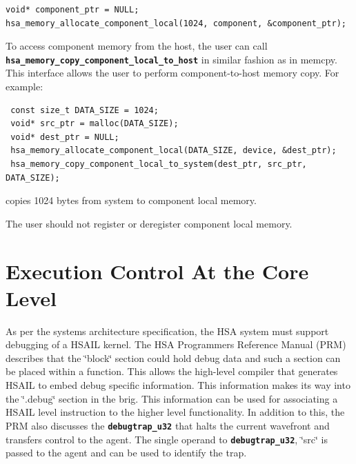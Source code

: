 \documentclass{book}
\newcommand{\diffblock}[1]{#1}
\newcommand{\ttbf}[1]{\diffblock{\texttt{\textbf{#1}}}}
\begin{document}
\begin{framed}
\begin{lstlisting}
void* component_ptr = NULL;
hsa_memory_allocate_component_local(1024, component, &component_ptr);
\end{lstlisting}
\end{framed}

To access component memory from the host, the user can call
\ttbf{hsa\_memory\_copy\_component\_local\_to\_host} in similar
fashion as in memcpy. This interface allows the user to
perform component-\/to-\/host memory copy. For example\-:

\begin{framed}
\begin{lstlisting}
 const size_t DATA_SIZE = 1024;
 void* src_ptr = malloc(DATA_SIZE);
 void* dest_ptr = NULL;
 hsa_memory_allocate_component_local(DATA_SIZE, device, &dest_ptr);
 hsa_memory_copy_component_local_to_system(dest_ptr, src_ptr, DATA_SIZE);
\end{lstlisting}
\end{framed}

copies 1024 bytes from system to component local memory.

The user should not register or deregister component local memory.


\hypertarget{coreapi_coredebug}{}\section{Execution Control At the Core Level}\label{coreapi_coredebug}

As per the systems architecture specification, the H\-S\-A system must
support debugging of a H\-S\-A\-I\-L kernel. The H\-S\-A
Programmers Reference Manual (P\-R\-M) describes that the
\char`\"{}block\char`\"{} section could hold debug data and such a
section can be placed within a function. This allows the
high-\/level compiler that generates H\-S\-A\-I\-L to embed debug
specific information. This information makes its way into the
\char`\"{}.\-debug\char`\"{} section in the brig. This information
can be used for associating a H\-S\-A\-I\-L level instruction to the
higher level functionality. In addition to this, the P\-R\-M also
discusses the \ttbf{debugtrap\_u32} that halts the current wavefront
and transfers control to the agent.  The single operand to
\ttbf{debugtrap\_u32}, \char`\"{}src\char`\"{} is passed to the
agent and can be used to identify the trap.
\end{document}
